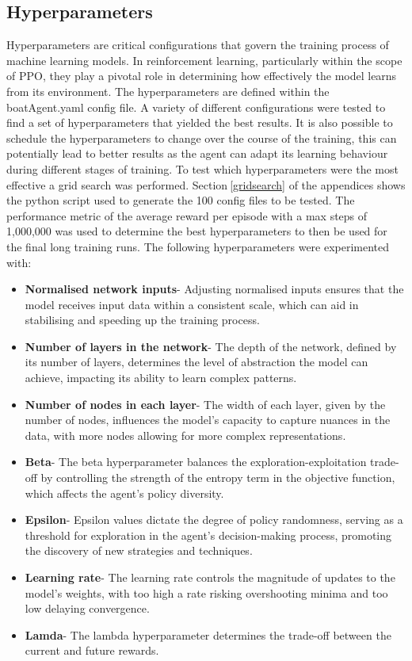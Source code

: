 \subsection{Hyperparameters}\label{sec:hyperparameters}
Hyperparameters are critical configurations that govern the training process of machine learning models. In reinforcement learning, particularly within the scope of PPO, they play a pivotal role in determining how effectively the model learns from its environment. The hyperparameters are defined within the boatAgent.yaml config file. A variety of different configurations were tested to find a set of hyperparameters that yielded the best results. It is also possible to schedule the hyperparameters to change over the course of the training, this can potentially lead to better results as the agent can adapt its learning behaviour during different stages of training. To test which hyperparameters were the most effective a grid search was performed. Section$~$\ref{gridsearch} of the appendices shows the python script used to generate the 100 config files to be tested. The performance metric of the average reward per episode with a max steps of 1,000,000 was used to determine the best hyperparameters to then be used for the final long training runs. The following hyperparameters were experimented with:
\begin{itemize}
    \item \textbf{Normalised network inputs}- Adjusting normalised inputs ensures that the model receives input data within a consistent scale, which can aid in stabilising and speeding up the training process.
    \item \textbf{Number of layers in the network}- The depth of the network, defined by its number of layers, determines the level of abstraction the model can achieve, impacting its ability to learn complex patterns.
    \item \textbf{Number of nodes in each layer}- The width of each layer, given by the number of nodes, influences the model's capacity to capture nuances in the data, with more nodes allowing for more complex representations.
    \item \textbf{Beta}- The beta hyperparameter balances the exploration-exploitation trade-off by controlling the strength of the entropy term in the objective function, which affects the agent's policy diversity.
    \item \textbf{Epsilon}- Epsilon values dictate the degree of policy randomness, serving as a threshold for exploration in the agent's decision-making process, promoting the discovery of new strategies and techniques.
    \item \textbf{Learning rate}- The learning rate controls the magnitude of updates to the model's weights, with too high a rate risking overshooting minima and too low delaying convergence.
    \item \textbf{Lamda}- The lambda hyperparameter determines the trade-off between the current and future rewards.
\end{itemize}
